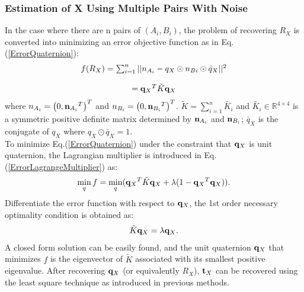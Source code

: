 \documentclass[twocolumn,10pt]{asme2ej}
\newcommand{\nn}{{\bf n}}
\newcommand{\ttt}{{\bf t}}
\newcommand{\qq}{{\bf q}}
\begin{document}
\subsubsection{Estimation of X Using Multiple Pairs With Noise} 
In the case where there are n pairs of $(A_{i}, B_{i})$, the problem of recovering $R_{X}$ is converted into minimizing an error objective function as in Eq.(\ref{ErrorQuaternion}):
\begin{equation}
\begin{array}{c}
f(R_{X})
= \sum_{i = 1}^{n}||{n_{A_{i}} - q_{X} \odot n_{B{i}} \odot \bar{q}_{X}}||^{2} \\
\\ 
= {\qq_{X}}^{T}\tilde{K}{\qq_{X}}
\end{array}
\label{ErrorQuaternion} 
\end{equation}
where $n_{A_{i}} = \left(0, {\nn_{A_{i}}}^{T}\right)^{T}$ and $n_{B_{i}} = \left(0, {\nn_{B_{i}}}^{T}\right)^{T}$. $\tilde{K} = \sum_{i = 1}^{n}\tilde{K_{i}}$ and $\tilde{K_{i}} \in \mathbb{R}^{4 \times 4}$ is a symmetric positive definite matrix determined by $\nn_{A_{i}}$ and $\nn_{B_{i}}$; $\bar{q}_{X}$ is the conjugate of ${q}_{X}$ where $q_{X} \odot \bar{q}_{X} = 1$.\\
To minimize  Eq.(\ref{ErrorQuaternion}) under the constraint that $\qq_{X}$ is unit quaternion, the Lagrangian multiplier is introduced in Eq.(\ref{ErrorLagrangeMultiplier}) as:
\begin{equation}
\min_{q} f = \min_{q}({\qq_{X}}^{T}\tilde{K}{\qq_{X}} + \lambda(1 - {\qq_{X}}^{T}{\qq_{X}})).
\label{ErrorLagrangeMultiplier}
\end{equation}
Differentiate the error function with respect to $\qq_{X}$, the 1st order necessary optimality condition is obtained as: 
\begin{equation}
\tilde{K}\qq_{X} = \lambda \qq_{X}.
\label{QuaternionEig}
\end{equation}
A closed form solution can be easily found, and the unit quaternion $\qq_{X}$ that minimizes $f$ is the eigenvector of $\tilde{K}$ associated with its smallest positive eigenvalue. After recovering $\qq_{X}$ (or equivalently $R_{X}$), $\ttt_{X}$ can be recovered using the least square technique as introduced in previous methods.
\end{document}
